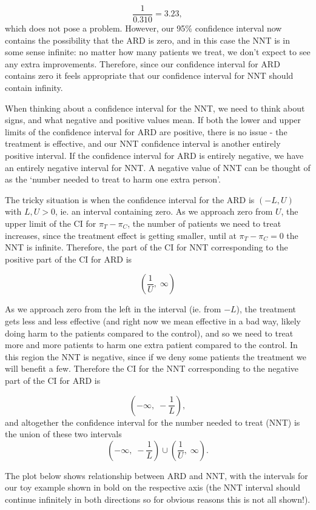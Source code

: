 \documentclass[
  openany]{book}
\theoremstyle{definition}
\theoremstyle{definition}
\theoremstyle{definition}
\theoremstyle{definition}
\theoremstyle{remark}
\begin{document}
\[ \frac{1}{0.310} = 3.23,\]
which does not pose a problem. However, our 95\% confidence interval now contains the possibility that the ARD is zero, and in this case the NNT is in some sense infinite: no matter how many patients we treat, we don't expect to see any extra improvements. Therefore, since our confidence interval for ARD contains zero it feels appropriate that our confidence interval for NNT should contain infinity.

When thinking about a confidence interval for the NNT, we need to think about signs, and what negative and positive values mean. If both the lower and upper limits of the confidence interval for ARD are positive, there is no issue - the treatment is effective, and our NNT confidence interval is another entirely positive interval. If the confidence interval for ARD is entirely negative, we have an entirely negative interval for NNT. A negative value of NNT can be thought of as the `number needed to treat to harm one extra person'.

The tricky situation is when the confidence interval for the ARD is \(\left(-L, U\right)\) with \(L,U>0\), ie. an interval containing zero. As we approach zero from \(U\), the upper limit of the CI for \(\pi_T - \pi_C\), the number of patients we need to treat increases, since the treatment effect is getting smaller, until at \(\pi_T - \pi_C=0\) the NNT is infinite. Therefore, the part of the CI for NNT corresponding to the positive part of the CI for ARD is

\[\left(\frac{1}{U},\; \infty\right)\]

As we approach zero from the left in the interval (ie. from \(-L\)), the treatment gets less and less effective (and right now we mean effective in a bad way, likely doing harm to the patients compared to the control), and so we need to treat more and more patients to harm one extra patient compared to the control. In this region the NNT is negative, since if we deny some patients the treatment we will benefit a few. Therefore the CI for the NNT corresponding to the negative part of the CI for ARD is

\[\left(-\infty,\;-\frac{1}{L}\right), \]
and altogether the confidence interval for the number needed to treat (NNT) is the union of these two intervals
\[\left(-\infty,\;-\frac{1}{L}\right) \cup \left(\frac{1}{U},\; \infty\right).\]

The plot below shows relationship between ARD and NNT, with the intervals for our toy example shown in bold on the respective axis (the NNT interval should continue infinitely in both directions so for obvious reasons this is not all shown!).
\end{document}
